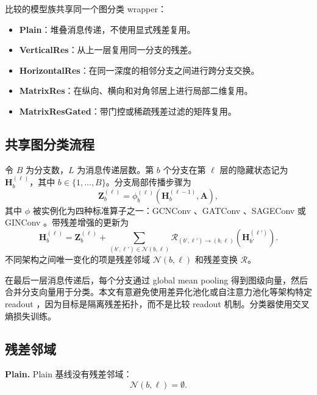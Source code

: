 \documentclass[UTF8,10pt]{ctexart}
\let\cite\citep
\begin{document}
比较的模型族共享同一个图分类 wrapper：
\begin{itemize}
    \item \textbf{Plain}：堆叠消息传递，不使用显式残差复用。
    \item \textbf{VerticalRes}：从上一层复用同一分支的残差。
    \item \textbf{HorizontalRes}：在同一深度的相邻分支之间进行跨分支交换。
    \item \textbf{MatrixRes}：在纵向、横向和对角邻居上进行局部二维复用。
    \item \textbf{MatrixResGated}：带门控或稀疏残差过滤的矩阵复用。
\end{itemize}

\subsection{共享图分类流程}

令 \(B\) 为分支数，\(L\) 为消息传递层数。第 \(b\) 个分支在第 \(\ell\) 层的隐藏状态记为 \(\mathbf{H}^{(\ell)}_{b}\)，其中 \(b\in\{1,\ldots,B\}\)。分支局部传播步骤为
\begin{equation}
\mathbf{Z}^{(\ell)}_{b} = \phi^{(\ell)}_{b}\left(\mathbf{H}^{(\ell-1)}_{b}, \mathbf{A}\right),
\end{equation}
其中 \(\phi\) 被实例化为四种标准算子之一：GCNConv \cite{kipf2017gcn}、GATConv \cite{velivckovic2017graph}、SAGEConv \cite{hamilton2017inductive} 或 GINConv \cite{xu2019gin}。带残差增强的更新为
\begin{equation}
\mathbf{H}^{(\ell)}_{b} =
\mathbf{Z}^{(\ell)}_{b} +
\sum_{(b',\ell')\in\mathcal{N}(b,\ell)}
\mathcal{R}_{(b',\ell')\rightarrow(b,\ell)}
\left(\mathbf{H}^{(\ell')}_{b'}\right).
\end{equation}
不同架构之间唯一变化的项是残差邻域 \(\mathcal{N}(b,\ell)\) 和残差变换 \(\mathcal{R}\)。

在最后一层消息传递后，每个分支通过 global mean pooling 得到图级向量，然后合并分支向量用于分类。本文有意避免使用差异化池化或自注意力池化等架构特定 readout \cite{ying2018hierarchical,lee2019self}，因为目标是隔离残差拓扑，而不是比较 readout 机制。分类器使用交叉熵损失训练。

\subsection{残差邻域}
\label{sec:model}

\textbf{Plain.} Plain 基线没有残差邻域：
\begin{equation}
\mathcal{N}(b,\ell)=\emptyset.
\end{equation}
\end{document}
